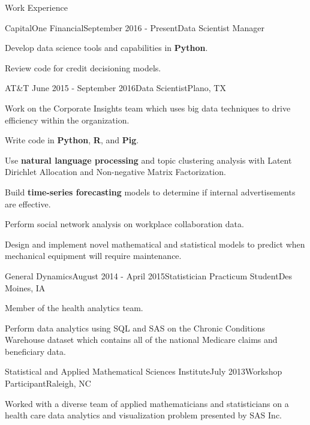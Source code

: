 \documentclass{resume} %
\begin{document}
\begin{rSection}{Work Experience}

\begin{rSubsection}{CapitalOne Financial}{September 2016 - Present}{Data Scientist Manager}
	\item Develop data science tools and capabilities in {\bf Python}.
	\item Review code for credit decisioning models.
\end{rSubsection}
	
\begin{rSubsection}{AT\&T }{June 2015 - September 2016}{Data Scientist}{Plano, TX}
	\item Work on the Corporate Insights team which uses big data techniques to drive efficiency within the organization.
	\item Write code in {\bf Python}, {\bf R}, and {\bf Pig}.
	\item Use {\bf natural language processing} and topic clustering analysis with Latent Dirichlet Allocation and Non-negative Matrix Factorization.
	\item Build {\bf time-series forecasting } models to determine if internal advertisements are effective.
	\item Perform social network analysis on workplace collaboration data.
	\item Design and implement novel mathematical and statistical models to predict when mechanical equipment will require maintenance.
\end{rSubsection}

\begin{rSubsection}{General Dynamics}{August 2014 - April 2015}{Statistician Practicum Student}{Des Moines, IA}
\item Member of the health analytics team.
\item Perform data analytics using SQL and SAS on the Chronic Conditions Warehouse dataset which contains all of the national Medicare claims and beneficiary data.
\end{rSubsection}


\begin{rSubsection}{Statistical and Applied Mathematical Sciences Institute}{July 2013}{Workshop Participant}{Raleigh, NC}
\item Worked with a diverse team of applied mathematicians and statisticians on a health care data analytics and visualization problem presented by SAS Inc.
\end{rSubsection}


\end{rSection}
\end{document}
